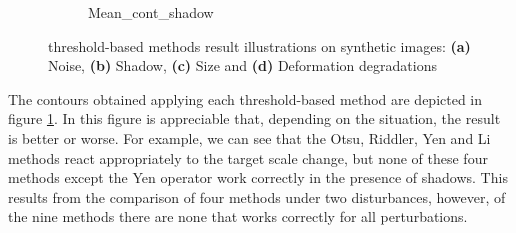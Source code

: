 \begin{figure}[htbp]
\begin{subfigure}[t]{0.15\textwidth}
{    {Mean_cont_shadow}}
    \caption{} 
\end{subfigure}\qquad
\begin{subfigure}[t]{0.15\textwidth}
    \caption{} 
\end{subfigure}\qquad
\begin{subfigure}[t]{0.15\textwidth}
    \caption{}  
\end{subfigure}
\caption{threshold-based methods result illustrations on synthetic images: \textbf{(a)} Noise, \textbf{(b)} Shadow, \textbf{(c)} Size and \textbf{(d)} Deformation degradations}\label{fig:thr_synth_comparison}
\end{figure}

The contours obtained applying each threshold-based method are depicted in figure \ref{fig:thr_synth_comparison}. In this figure is appreciable that, depending on the situation, the result is better or worse. For example, we can see that the Otsu, Riddler, Yen and Li methods react appropriately to the target scale change, but none of these four methods except the Yen operator work correctly in the presence of shadows. This results from the comparison of four methods under two disturbances, however, of the nine methods there are none that works correctly for all perturbations.

